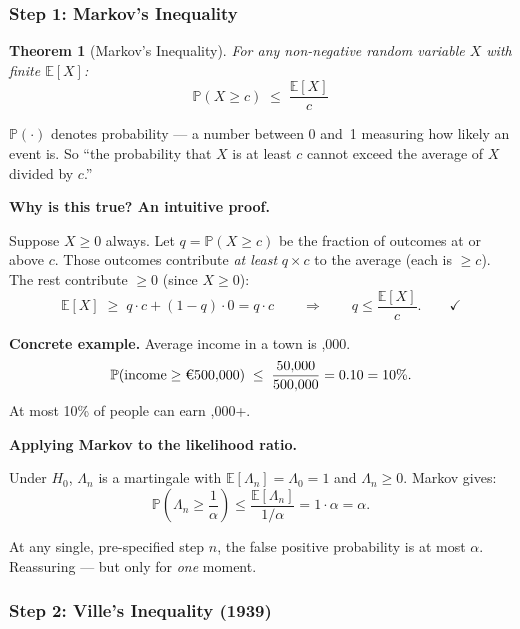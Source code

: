 \documentclass[12pt, a4paper]{article}
\newtheorem{theorem}{Theorem}
\newcommand{\E}{\mathbb{E}}            %
\newcommand{\Prob}{\mathbb{P}}         %
\newcommand{\LR}{\Lambda}              %
\begin{document}
\subsubsection*{Step 1: Markov's Inequality}

\begin{theorem}[Markov's Inequality]
For any non-negative random variable $X$ with finite $\E[X]$:
\[
  \boxed{\Prob(X \geq c) \;\leq\; \frac{\E[X]}{c}}
\]
\end{theorem}

\begin{plainlanguage}
$\Prob(\cdot)$ denotes probability --- a number between 0 and~1 measuring how
likely an event is.  So ``the probability that $X$ is at least $c$ cannot
exceed the average of $X$ divided by $c$.''
\end{plainlanguage}

\textbf{Why is this true?  An intuitive proof.}

Suppose $X \geq 0$ always.  Let $q = \Prob(X \geq c)$ be the fraction of
outcomes at or above $c$.  Those outcomes contribute \emph{at least}
$q \times c$ to the average (each is $\geq c$).  The rest contribute $\geq 0$
(since $X \geq 0$):
\[
  \E[X] \;\geq\; q \cdot c + (1-q)\cdot 0 = q \cdot c
  \qquad\Longrightarrow\qquad
  q \leq \frac{\E[X]}{c}. \qquad\checkmark
\]

\textbf{Concrete example.}
Average income in a town is ,000.
\[
  \Prob(\text{income} \geq \text{\texteuro}500{,}000)
  \;\leq\;
  \frac{50{,}000}{500{,}000} = 0.10 = 10\%.
\]
At most 10\% of people can earn ,000+.

\textbf{Applying Markov to the likelihood ratio.}

Under $H_0$, $\LR_n$ is a martingale with $\E[\LR_n] = \LR_0 = 1$ and
$\LR_n \geq 0$.  Markov gives:
\[
  \Prob\!\left(\LR_n \geq \frac{1}{\alpha}\right)
  \leq \frac{\E[\LR_n]}{1/\alpha}
  = 1 \cdot \alpha
  = \alpha.
\]

\begin{plainlanguage}
At any single, pre-specified step $n$, the false positive probability
is at most $\alpha$.  Reassuring --- but only for \emph{one} moment.
\end{plainlanguage}

\subsubsection*{Step 2: Ville's Inequality (1939)}
\end{document}
